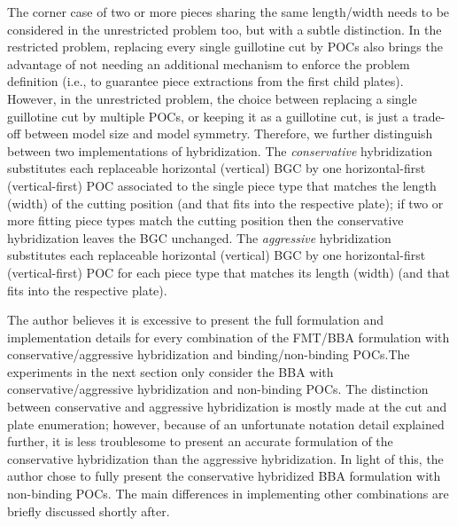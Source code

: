 \documentclass[ppgc,tese,english,formais,babel]{iiufrgs}
\begin{document}
The corner case of two or more pieces sharing the same length/width needs to be considered in the unrestricted problem too, but with a subtle distinction.
In the restricted problem, replacing every single guillotine cut by POCs also brings the advantage of not needing an additional mechanism to enforce the problem definition (i.e., to guarantee piece extractions from the first child plates).
However, in the unrestricted problem, the choice between replacing a single guillotine cut by multiple POCs, or keeping it as a guillotine cut, is just a trade-off between model size and model symmetry.
Therefore, we further distinguish between two implementations of hybridization.
The \emph{conservative} hybridization substitutes each replaceable horizontal (vertical) BGC by one horizontal-first (vertical-first) POC associated to the single piece type that matches the length (width) of the cutting position (and that fits into the respective plate); if two or more fitting piece types match the cutting position then the conservative hybridization leaves the BGC unchanged.
The \emph{aggressive} hybridization substitutes each replaceable horizontal (vertical) BGC by one horizontal-first (vertical-first) POC for each piece type that matches its length (width) (and that fits into the respective plate).

The author believes it is excessive to present the full formulation and implementation details for every combination of the FMT/BBA formulation with conservative/aggressive hybridization and binding/non-binding POCs.The experiments in the next section only consider the BBA with conservative/aggressive hybridization and non-binding POCs.
The distinction between conservative and aggressive hybridization is mostly made at the cut and plate enumeration; however, because of an unfortunate notation detail explained further, it is less troublesome to present an accurate formulation of the conservative hybridization than the aggressive hybridization.
In light of this, the author chose to fully present the conservative hybridized BBA formulation with non-binding POCs.
The main differences in implementing other combinations are briefly discussed shortly after.
\end{document}
